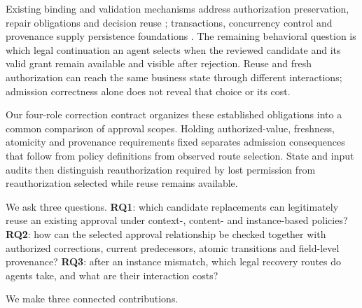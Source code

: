 \documentclass[pdflatex,sn-basic]{sn-jnl}
\begin{document}
Existing binding and validation mechanisms address authorization preservation, repair obligations and decision reuse \citep{zhu2026resa,bindschaedler2026guarded}; transactions, concurrency control and provenance supply persistence foundations \citep{gray-transaction,kung-occ,buneman-provenance}. The remaining behavioral question is which legal continuation an agent selects when the reviewed candidate and its valid grant remain available and visible after rejection. Reuse and fresh authorization can reach the same business state through different interactions; admission correctness alone does not reveal that choice or its cost.

Our four-role correction contract organizes these established obligations into a common comparison of approval scopes. Holding authorized-value, freshness, atomicity and provenance requirements fixed separates admission consequences that follow from policy definitions from observed route selection. State and input audits then distinguish reauthorization required by lost permission from reauthorization selected while reuse remains available.

We ask three questions. \textbf{RQ1}: which candidate replacements can legitimately reuse an existing approval under context-, content- and instance-based policies? \textbf{RQ2}: how can the selected approval relationship be checked together with authorized corrections, current predecessors, atomic transitions and field-level provenance? \textbf{RQ3}: after an instance mismatch, which legal recovery routes do agents take, and what are their interaction costs?

We make three connected contributions.
\end{document}
